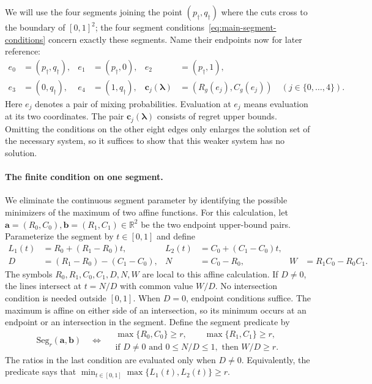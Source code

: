 \documentclass[11pt]{article}
\theoremstyle{remark}
\theoremstyle{plain}
\begin{document}
We will use the four segments joining the point
$(p_\dagger,q_\dagger)$ where the cuts cross to the boundary of
$[0,1]^2$; the four segment conditions~\eqref{eq:main-segment-conditions}
concern exactly these segments. Name their endpoints now for later reference:
\begin{equation}
 \begin{aligned}
 e_0&=(p_\dagger,q_\dagger),&
 e_1&=(p_\dagger,0),&
 e_2&=(p_\dagger,1),\\
 e_3&=(0,q_\dagger),&
 e_4&=(1,q_\dagger),&
 \boldsymbol c_j(\boldsymbol\lambda)&=(R_g(e_j),C_g(e_j))
       \quad(j\in\{0,\ldots,4\}).
 \end{aligned}
 \label{eq:app-mixing-segment-points}
\end{equation}
Here $e_j$ denotes a pair of mixing probabilities. Evaluation at $e_j$ means evaluation at its two
coordinates. The pair $\boldsymbol c_j(\boldsymbol\lambda)$ consists of regret
upper bounds. Omitting the conditions on the other eight edges only
enlarges the solution set of the necessary system, so it suffices to
show that this weaker system has no solution.

\paragraph{The finite condition on one segment.}
We eliminate the continuous segment parameter by identifying the
possible minimizers of the maximum of two affine functions.
For this calculation, let
$\boldsymbol a=(R_0,C_0),\boldsymbol b=(R_1,C_1)\in\mathbb R^2$
be the two endpoint upper-bound pairs. Parameterize the segment
by $t\in[0,1]$ and define
\begin{equation}
 \begin{aligned}
 L_1(t)&=R_0+(R_1-R_0)t,&
 L_2(t)&=C_0+(C_1-C_0)t,\\
 D&=(R_1-R_0)-(C_1-C_0),&
 N&=C_0-R_0,&
 W&=R_1C_0-R_0C_1.
 \end{aligned}
 \label{eq:app-affine-segment-data}
\end{equation}
The symbols $R_0,R_1,C_0,C_1,D,N,W$ are local to this affine
calculation. If $D\ne0$, the lines intersect at $t=N/D$ with
common value $W/D$. No intersection condition is needed outside $[0,1]$.
When $D=0$, endpoint conditions suffice.
The maximum is affine on either side of an intersection, so its
minimum occurs at an endpoint or an intersection in the segment.
Define the segment predicate by
\begin{equation}
 \mathrm{Seg}_r(\boldsymbol a,\boldsymbol b)
 \quad\Longleftrightarrow\quad
 \begin{gathered}
 \max\{R_0,C_0\}\ge r,\qquad \max\{R_1,C_1\}\ge r,\\
 \text{if }D\ne0\text{ and }0\le N/D\le1,\text{ then }W/D\ge r.
 \end{gathered}
 \label{eq:segment-test}
\end{equation}
The ratios in the last condition are evaluated only when $D\ne0$.
Equivalently, the predicate says that
$\min_{t\in[0,1]}\max\{L_1(t),L_2(t)\}\ge r$.
\end{document}

